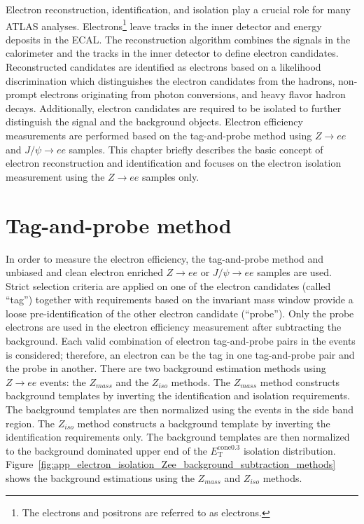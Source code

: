 Electron reconstruction, identification, and isolation play a crucial role for many ATLAS analyses.
Electrons\footnote{The electrons and positrons are referred to as electrons.} leave tracks in the inner detector and energy deposits in the ECAL.
The reconstruction algorithm combines the signals in the calorimeter and the tracks in the inner detector to define electron candidates.
Reconstructed candidates are identified as electrons based on a likelihood discrimination which distinguishes the electron candidates from the hadrons, non-prompt electrons originating from photon conversions, and heavy flavor hadron decays.
Additionally, electron candidates are required to be isolated to further distinguish the signal and the background objects.
Electron efficiency measurements are performed based on the tag-and-probe method using $Z \to ee$ and $J/\psi \to ee$ samples.
This chapter briefly describes the basic concept of electron reconstruction and identification and focuses on the electron isolation measurement using the $Z \to ee$ samples only.


\section{Tag-and-probe method}
\label{sec:app_tag_and_probe_method}
In order to measure the electron efficiency, the tag-and-probe method and unbiased and clean electron enriched $Z \to ee$ or $J/\psi \to ee$ samples are used.
Strict selection criteria are applied on one of the electron candidates (called ``tag'') together with requirements based on the invariant mass window provide a loose pre-identification of the other electron candidate (``probe'').
Only the probe electrons are used in the electron efficiency measurement after subtracting the background.
Each valid combination of electron tag-and-probe pairs in the events is considered; therefore, an electron can be the tag in one tag-and-probe pair and the probe in another.
There are two background estimation methods using $Z \to ee$ events: the $Z_{mass}$ and the $Z_{iso}$ methods.
The $Z_{mass}$ method constructs background templates by inverting the identification and isolation requirements.
The background templates are then normalized using the events in the side band region.
The $Z_{iso}$ method constructs a background template by inverting the identification requirements only.
The background templates are then normalized to the background dominated upper end of the $E_\mathrm{T}^\mathrm{cone0.3}$ isolation distribution.
Figure~\ref{fig:app_electron_isolation_Zee_background_subtraction_methods} shows the background estimations using the $Z_{mass}$ and $Z_{iso}$ methods.

